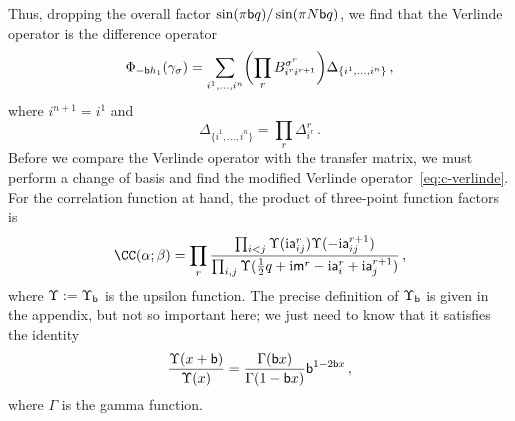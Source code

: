 Thus, dropping the overall factor $\sin(\pi \mathsf{b} q)/\sin(\pi N\mathsf{b} q)$, we
find that the Verlinde operator is the difference operator
\begin{equation}
  \Phi_{-\mathsf{b} h_1}(\gamma_\sigma)
  =
  \sum_{i^1, \dotsc, i^n}
  \biggl(\prod_r B^{\sigma^r}_{i^r i^{r+1}}\biggr)
  \Delta_{\{i^1,\dotsc,i^n\}}  \,,
\end{equation}
where $i^{n+1} = i^1$ and
\begin{equation}
  \Delta_{\{i^1,\dotsc,i^n\}}
  =
  \prod_r \Delta^r_{i^r} \,.
\end{equation}
Before we compare the Verlinde operator with the transfer matrix, we
must perform a change of basis and find the modified Verlinde
operator~\eqref{eq:c-verlinde}.  For the correlation function at hand,
the product of three-point function factors is
\begin{equation}
  \CC(\alpha; \beta)
  =
  \prod_r
  \frac{\prod_{i<j} \Upsilon(\iu \as^r_{ij}) \Upsilon(-\iu \as^{r+1}_{ij})}
        {\prod_{i,j} \Upsilon(\frac12 q + \iu \ms^r - \iu \as^r_i + \iu \as^{r+1}_j)}
  \, ,
\end{equation}
where $\Upsilon:=\Upsilon_{\mathsf{b}}$ is the upsilon function.
The precise definition of $\Upsilon_{\mathsf{b}}$ is given in the appendix,
but not so important here; we just need to know that it satisfies the identity
\begin{equation}
  \frac{\Upsilon(x + \mathsf{b})}{\Upsilon(x)}
  = \frac{\Gamma(\mathsf{b} x)}{\Gamma(1 - \mathsf{b} x)} \mathsf{b}^{1 - 2\mathsf{b} x} \,,
\end{equation}
where $\Gamma$ is the gamma function.

